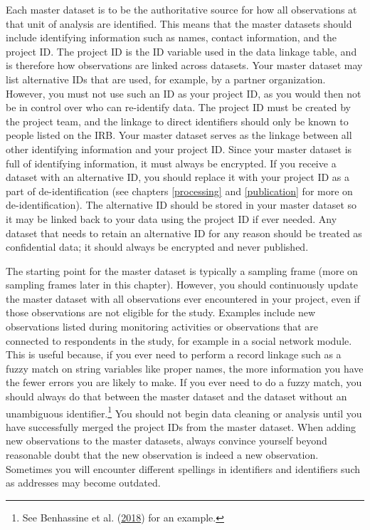 \documentclass[
]{book}
\begin{document}
Each master dataset is to be the authoritative source
for how all observations at that unit of analysis are identified.
This means that the master datasets should include
identifying information such as names, contact information,
and the project ID.
The project ID is the ID variable used in the data linkage table,
and is therefore how observations are linked across datasets.
Your master dataset may list alternative IDs that are used,
for example, by a partner organization.
However, you must not use such an ID as your project ID,
as you would then not be in control over
who can re-identify data.
The project ID must be created by the project team,
and the linkage to direct identifiers
should only be known to people listed on the IRB.
Your master dataset serves as the linkage between
all other identifying information and your project ID.
Since your master dataset is full of identifying information,
it must always be encrypted.
If you receive a dataset with an alternative ID,
you should replace it with your project ID as a part of de-identification
(see chapters \ref{processing} and \ref{publication} for more on de-identification).
The alternative ID should be stored in your master dataset
so it may be linked back to your data using the project ID if ever needed.
Any dataset that needs to retain an alternative ID for any reason
should be treated as confidential data;
it should always be encrypted and never published.

The starting point for the master dataset is typically a sampling frame
(more on sampling frames later in this chapter).
However, you should continuously update the master dataset with
all observations ever encountered in your project,
even if those observations are not eligible for the study.
Examples include new observations listed during monitoring activities
or observations that are connected to respondents in the study,
for example in a social network module.
This is useful because,
if you ever need to perform a record linkage such as a fuzzy match
on string variables like proper names,
the more information you have the fewer errors you are likely to make.
If you ever need to do a fuzzy match,
you should always do that between the master dataset
and the dataset without an unambiguous identifier.\footnote{See Benhassine et al. (\protect\hyperlink{ref-benhassine2018does}{2018}) for an example.}
You should not begin data cleaning or analysis until you have successfully merged
the project IDs from the master dataset.
When adding new observations to the master datasets,
always convince yourself beyond reasonable doubt
that the new observation is indeed a new observation.
Sometimes you will encounter different spellings in identifiers
and identifiers such as addresses may become outdated.
\end{document}
